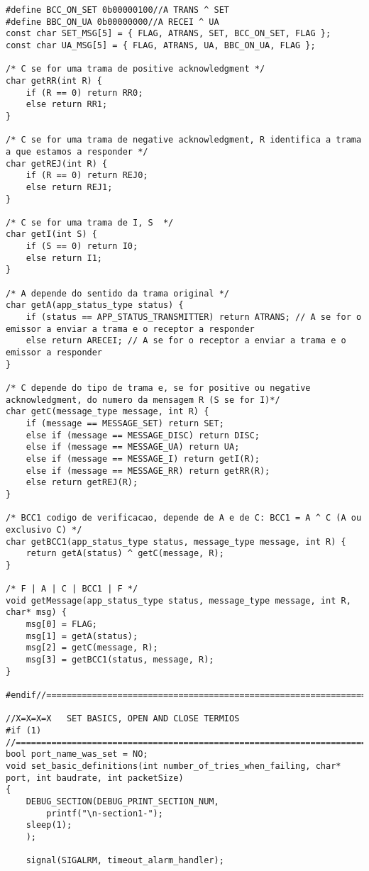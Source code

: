 \begin{lstlisting}
#define BCC_ON_SET 0b00000100//A TRANS ^ SET
#define BBC_ON_UA 0b00000000//A RECEI ^ UA
const char SET_MSG[5] = { FLAG, ATRANS, SET, BCC_ON_SET, FLAG };
const char UA_MSG[5] = { FLAG, ATRANS, UA, BBC_ON_UA, FLAG };

/* C se for uma trama de positive acknowledgment */
char getRR(int R) {
	if (R == 0) return RR0;
	else return RR1;
}

/* C se for uma trama de negative acknowledgment, R identifica a trama a que estamos a responder */
char getREJ(int R) {
	if (R == 0) return REJ0;
	else return REJ1;
}

/* C se for uma trama de I, S  */
char getI(int S) {
	if (S == 0) return I0;
	else return I1;
}

/* A depende do sentido da trama original */
char getA(app_status_type status) {
	if (status == APP_STATUS_TRANSMITTER) return ATRANS; // A se for o emissor a enviar a trama e o receptor a responder
	else return ARECEI; // A se for o receptor a enviar a trama e o emissor a responder
}

/* C depende do tipo de trama e, se for positive ou negative acknowledgment, do numero da mensagem R (S se for I)*/
char getC(message_type message, int R) {
	if (message == MESSAGE_SET) return SET;
	else if (message == MESSAGE_DISC) return DISC;
	else if (message == MESSAGE_UA) return UA;
	else if (message == MESSAGE_I) return getI(R);
	else if (message == MESSAGE_RR) return getRR(R);
	else return getREJ(R);
}

/* BCC1 codigo de verificacao, depende de A e de C: BCC1 = A ^ C (A ou exclusivo C) */
char getBCC1(app_status_type status, message_type message, int R) {
	return getA(status) ^ getC(message, R);
}

/* F | A | C | BCC1 | F */
void getMessage(app_status_type status, message_type message, int R, char* msg) {
	msg[0] = FLAG;
	msg[1] = getA(status);
	msg[2] = getC(message, R);
	msg[3] = getBCC1(status, message, R);
}

#endif//==========================================================================

//X=X=X=X   SET BASICS, OPEN AND CLOSE TERMIOS
#if (1)
//===============================================================================
bool port_name_was_set = NO;
void set_basic_definitions(int number_of_tries_when_failing, char* port, int baudrate, int packetSize)
{
	DEBUG_SECTION(DEBUG_PRINT_SECTION_NUM,
		printf("\n-section1-");
	sleep(1);
	);

	signal(SIGALRM, timeout_alarm_handler);
	

\end{lstlisting}

